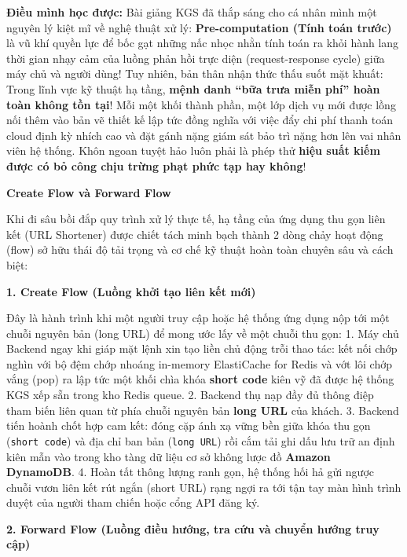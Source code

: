 \textbf{Điều mình học được:} Bài giảng KGS đã thắp sáng cho cá nhân mình
một nguyên lý kiệt mĩ về nghệ thuật xử lý: \textbf{Pre-computation (Tính
toán trước)} là vũ khí quyền lực để bốc gạt những nấc nhọc nhằn tính
toán ra khỏi hành lang thời gian nhạy cảm của luồng phản hồi trực diện
(request-response cycle) giữa máy chủ và người dùng! Tuy nhiên, bản thân
nhận thức thấu suốt mặt khuất: Trong lĩnh vực kỹ thuật hạ tầng,
\textbf{mệnh danh ``bữa trưa miễn phí'' hoàn toàn không tồn tại}! Mỗi
một khối thành phần, một lớp dịch vụ mới được lồng nối thêm vào bản vẽ
thiết kế lập tức đồng nghĩa với việc đẩy chi phí thanh toán cloud định
kỳ nhích cao và đặt gánh nặng giám sát bảo trì nặng hơn lên vai nhân
viên hệ thống. Khôn ngoan tuyệt hảo luôn phải là phép thử \textbf{hiệu
suất kiếm được có bỏ công chịu trừng phạt phức tạp hay không}!

\vspace{0.5em}\noindent\textbf{Create Flow và Forward
Flow}\par

Khi đi sâu bồi đắp quy trình xử lý thực tế, hạ tầng của ứng dụng thu gọn
liên kết (URL Shortener) được chiết tách minh bạch thành 2 dòng chảy
hoạt động (flow) sở hữu thái độ tải trọng và cơ chế kỹ thuật hoàn toàn
chuyên sâu và cách biệt:

\vspace{0.5em}\noindent\textbf{1. Create Flow (Luồng khởi tạo liên kết
mới)}\par

Đây là hành trình khi một người truy cập hoặc hệ thống ứng dụng nộp tới
một chuỗi nguyên bản (long URL) để mong ước lấy về một chuỗi thu gọn: 1.
Máy chủ Backend ngay khi giáp mặt lệnh xin tạo liền chủ động trỗi thao
tác: kết nối chớp nghìn với bộ đệm chớp nhoáng in-memory ElastiCache for
Redis và vớt lôi chớp vắng (pop) ra lập tức một khối chìa khóa
\textbf{short code} kiên vỹ đã được hệ thống KGS xếp sẵn trong kho Redis
queue. 2. Backend thụ nạp đầy đủ thông điệp tham biến liên quan từ phía
chuỗi nguyên bản \textbf{long URL} của khách. 3. Backend tiến hoành chốt
hợp cam kết: đóng cặp ánh xạ vững bền giữa khóa thu gọn
(\texttt{short\ code}) và địa chỉ ban bản (\texttt{long\ URL}) rồi cắm
tải ghi dấu lưu trữ an định kiên mẫn vào trong kho tàng dữ liệu cơ sở
không lược đồ \textbf{Amazon DynamoDB}. 4. Hoàn tất thông lượng ranh
gọn, hệ thống hối hả gửi ngược chuỗi vươn liên kết rút ngắn (short URL)
rạng ngợi ra tới tận tay màn hình trình duyệt của người tham chiến hoặc
cổng API đăng ký.

\vspace{0.5em}\noindent\textbf{2. Forward Flow (Luồng điều hướng, tra cứu và chuyển
hướng truy
cập)}\par

